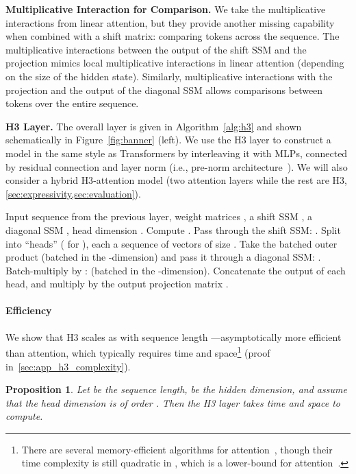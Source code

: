 \documentclass{article}
\newtheorem{proposition}{Proposition}
\newcommand{\hthree}{\textsc{H3}\xspace}
\begin{document}
\textbf{Multiplicative Interaction for Comparison.}
We take the multiplicative interactions from linear attention, but they provide another missing capability when combined with a shift matrix: comparing tokens across the sequence.
The multiplicative interactions between the output of the shift SSM and the  projection mimics local multiplicative interactions in linear attention (depending on the size of the hidden state).
Similarly, multiplicative interactions with the  projection and the output of the diagonal SSM allows comparisons between tokens over the entire sequence.

\textbf{\hthree Layer.} The overall layer is given in Algorithm~\ref{alg:h3} and shown schematically in Figure~\ref{fig:banner} (left).
We use the \hthree layer to construct a model in the same style as Transformers by interleaving it with MLPs,
connected by residual connection and layer norm (i.e., pre-norm architecture~\citep{baevski2018adaptive}).
We will also consider a hybrid \hthree-attention model (two attention layers while the rest are \hthree, \cref{sec:expressivity,sec:evaluation}).
\begin{algorithm}[H]
  \caption{\label{alg:h3} H3 Layer}
  \small
  \begin{algorithmic}[1]
    \REQUIRE Input sequence  from the previous layer, weight
    matrices , a shift SSM , a diagonal SSM , head dimension .
    \STATE Compute .
    \STATE Pass  through the shift SSM: .
    \STATE Split  into  ``heads'' (
    for ), each a sequence of  vectors of size .
    \FOR{}
    \STATE Take the batched outer product  (batched in the -dimension) and pass it through a diagonal SSM: .
    \STATE Batch-multiply by :   (batched in the -dimension).
    \ENDFOR
    \STATE Concatenate the output  of each head, and multiply by the output
    projection matrix .
  \end{algorithmic}
\end{algorithm}

\paragraph{Efficiency}
We show that \hthree scales as  with
sequence length ---asymptotically more efficient than attention, which typically requires  time and  space\footnote{There are several memory-efficient
algorithms for attention~\citep{rabe2021self,dao2022flashattention}, though
their time complexity is still quadratic in , which is a lower-bound for attention~\citep{keles2022computational}.} (proof in~\cref{sec:app_h3_complexity}).
\begin{proposition}\label{thm:h3_complexity}
  Let  be the sequence length,  be the hidden dimension, and assume that
  the head dimension  is of order .
  Then the H3 layer takes  time and  space to compute.
\end{proposition}
\end{document}
